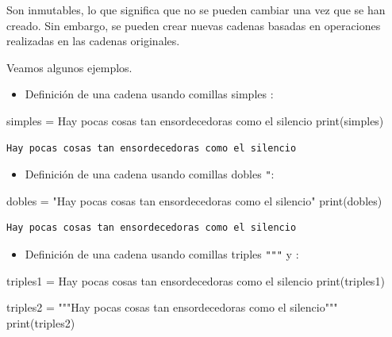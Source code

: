 \documentclass[
  spanish,
  letterpaper,
]{scrbook}
\newenvironment{Shaded}{\begin{snugshade}}{\end{snugshade}}
\newcommand{\BuiltInTok}[1]{\textcolor[rgb]{0.00,0.23,0.31}{#1}}
\newcommand{\NormalTok}[1]{\textcolor[rgb]{0.00,0.23,0.31}{#1}}
\newcommand{\OperatorTok}[1]{\textcolor[rgb]{0.37,0.37,0.37}{#1}}
\newcommand{\StringTok}[1]{\textcolor[rgb]{0.13,0.47,0.30}{#1}}
\providecommand{\tightlist}{%
  \setlength{\itemsep}{0pt}\setlength{\parskip}{0pt}}
\theoremstyle{definition}
\theoremstyle{remark}
\begin{document}
Son inmutables, lo que significa que no se pueden cambiar una vez que se
han creado. Sin embargo, se pueden crear nuevas cadenas basadas en
operaciones realizadas en las cadenas originales.

Veamos algunos ejemplos.

\begin{itemize}
\tightlist
\item
  Definición de una cadena usando comillas simples
  \texttt{\textquotesingle{}}:
\end{itemize}

\begin{Shaded}
\begin{Highlighting}[]
\NormalTok{simples }\OperatorTok{=} \StringTok{\textquotesingle{}Hay pocas cosas tan ensordecedoras como el silencio\textquotesingle{}}
\BuiltInTok{print}\NormalTok{(simples)}
\end{Highlighting}
\end{Shaded}

\begin{verbatim}
Hay pocas cosas tan ensordecedoras como el silencio
\end{verbatim}

\begin{itemize}
\tightlist
\item
  Definición de una cadena usando comillas dobles \texttt{"}:
\end{itemize}

\begin{Shaded}
\begin{Highlighting}[]
\NormalTok{dobles }\OperatorTok{=} \StringTok{"Hay pocas cosas tan ensordecedoras como el silencio"}
\BuiltInTok{print}\NormalTok{(dobles)}
\end{Highlighting}
\end{Shaded}

\begin{verbatim}
Hay pocas cosas tan ensordecedoras como el silencio
\end{verbatim}

\begin{itemize}
\tightlist
\item
  Definición de una cadena usando comillas triples \texttt{"""} y
  \texttt{\textquotesingle{}\textquotesingle{}\textquotesingle{}}:
\end{itemize}

\begin{Shaded}
\begin{Highlighting}[]
\NormalTok{triples1 }\OperatorTok{=} \StringTok{\textquotesingle{}\textquotesingle{}\textquotesingle{}Hay pocas cosas tan ensordecedoras como el silencio\textquotesingle{}\textquotesingle{}\textquotesingle{}}
\BuiltInTok{print}\NormalTok{(triples1)}

\NormalTok{triples2 }\OperatorTok{=} \StringTok{"""Hay pocas cosas tan ensordecedoras como el silencio"""}
\BuiltInTok{print}\NormalTok{(triples2)}
\end{Highlighting}
\end{Shaded}
\end{document}

